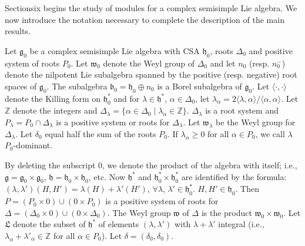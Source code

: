 Section\pageoriginale six begins the study of modules for a complex
semisimple Lie algebra. We now introduce the notation necessary to
complete the description of the main results.


Let $\mathfrak{g}_0$ be a complex semisimple Lie algebra with CSA
$\mathfrak{h}_0$, roots $\Delta_0$ and positive system of roots
$P_0$. Let $\mathfrak{w}_0$ denote the Weyl group of $\Delta_0$ and
let $n_0$ (resp. $n^-_0$) denote the nilpotent Lie subalgebra spanned
by the positive (resp. negative) root spaces of $\mathfrak{g}_0$. The
subalgebra $\mathfrak{b}_0 = \mathfrak{h}_0 \oplus n_0$ is a Borel
subalgebra of $\mathfrak{g}_0$. Let $\langle \cdot , \cdot \rangle$
denote the Killing form on $\mathfrak{h}^*_0$ and for $\lambda \in
\mathfrak{h}^*$, $\alpha \in \Delta_0$, let $\lambda_\alpha = 2
\langle \lambda, \alpha \rangle / \langle \alpha, \alpha \rangle$. Let
$\mathbb{Z}$ denote the integers and $\Delta_\lambda = \{\alpha \in
\Delta_0 \mid    \lambda_\alpha \in \mathbb{Z}\}$. $\Delta_\lambda$ is a
root system and $P_\lambda = P_0 \cap \Delta_\lambda$ is a positive
system or roots for $\Delta_\lambda$. Let $\mathfrak{w}_\lambda$ be
the Weyl group for $\Delta_\lambda$. Let $\delta_0$ equal half the sum
of the roots $P_0$. If $\lambda_\alpha \geq 0$ for all $\alpha \in
P_0$, we call $\lambda$ $P_0$-dominant.

By deleting the subscript $0$, we denote the product of the algebra
with itself; i.e., $\mathfrak{g}=\mathfrak{g}_0 \times \mathfrak{g}_0$,
$\mathfrak{h} = \mathfrak{h}_0 \times \mathfrak{h}_0$, etc. Now
$\mathfrak{h}^*$ and $\mathfrak{h}^*_0 \times \mathfrak{h}^*_0$ are
identified by the formula: $(\lambda, \lambda') (H, H') = \lambda (H)
+ \lambda' (H')$, $\forall \lambda$, $\lambda' \in
\mathfrak{h}^*_0$. $H, H' \in \mathfrak{h}_0$. Then $P= (P_0 \times 0)
\cup (0 \times P_0)$ is a positive system of roots for $\Delta =
(\Delta_0 \times 0) \cup (0 \times \Delta_0)$. The Weyl group
$\mathfrak{w}$ of $\Delta$ is the product $\mathfrak{w}_0 \times
\mathfrak{w}_0$. Let $\mathfrak{L}$ denote the subset of
$\mathfrak{h}^*$ of elements $(\lambda, \lambda')$ with $\lambda +
\lambda'$ integral (i.e., $\lambda_\alpha + \lambda'_\alpha \in
\mathbb{Z}$ for all $\alpha \in P_0$). Let $\delta = (\delta_0,
\delta_0)$. 

